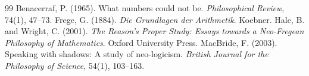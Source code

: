 \documentclass{situationist-preprint}
\begin{document}
\begin{thebibliography}{99}\small
{} Benacerraf, P. (1965). What numbers could not be. \emph{Philosophical Review}, 74(1), 47--73.
 Frege, G. (1884). \emph{Die Grundlagen der Arithmetik}. Koebner.
 Hale, B. and Wright, C. (2001). \emph{The Reason's Proper Study: Essays towards a Neo-Fregean Philosophy of Mathematics}. Oxford University Press.
 MacBride, F. (2003). Speaking with shadows: A study of neo-logicism. \emph{British Journal for the Philosophy of Science}, 54(1), 103--163.
\end{thebibliography}
\end{document}
